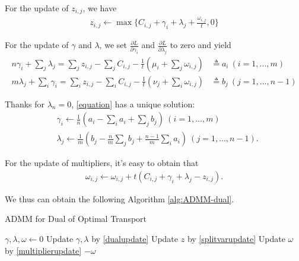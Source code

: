 \documentclass[english]{pkupaper}
\newenvironment{eqt}{\begin{equation}\begin{aligned}}{\end{aligned}\end{equation}}
\begin{document}
For the update of $z_{i, j}$, we have
\begin{eqt}
z_{i, j}\gets \max\{C_{i, j}+\gamma_i+\lambda_j+\frac{\omega_{i, j}}{t}, 0\} \label{splitvarupdate}
\end{eqt}

For the update of $\gamma$ and $\lambda$, we set $\frac{\partial L}{\partial \gamma_i}$ and $\frac{\partial L}{\partial \lambda_j}$ to zero and yield
\begin{eqt}
n\gamma_i+\sum_j\lambda_j = \sum_jz_{i, j}-\sum_jC_{i, j}-\frac{1}{t}(\mu_i+\sum_j\omega_{i, j})&\triangleq a_i\ (i=1, ..., m)\\
m\lambda_j + \sum_i\gamma_i = \sum_iz_{i, j} - \sum_iC_{i, j} - \frac{1}{t}(\nu_j+\sum_i\omega_{i, j})&\triangleq b_j\ (j=1, ..., n-1) \label{equation}
\end{eqt}

Thanks for $\lambda_n=0$, \ref{equation} has a unique solution:
\begin{eqt}
&\gamma_i \gets \frac{1}{n}\left(a_i-\sum_ia_i+\sum_jb_j\right)\ (i=1, ..., m)\\
&\lambda_j \gets \frac{1}{m}\left(b_j - \frac{n}{m}\sum_jb_j+\frac{n-1}{m}\sum_ia_i\right)\ (j=1, ..., n-1). \label{dualupdate}
\end{eqt}

For the update of multipliers, it's easy to obtain that
\begin{eqt}
\omega_{i, j}\gets \omega_{i, j}+t(C_{i, j}+\gamma_i+\lambda_j-z_{i, j}). \label{multiplierupdate}
\end{eqt}

We thus can obtain the following Algorithm \ref{alg:ADMM-dual}.

\begin{algorithm}
\caption{ADMM for Dual of Optimal Transport}
\label{alg:ADMM-dual}
\begin{algorithmic}[1]
\STATE $\gamma, \lambda, \omega\gets 0$
	\STATE Update $\gamma, \lambda$ by \ref{dualupdate}
	\STATE Update $z$ by \ref{splitvarupdate}
	\STATE Update $\omega$  by \ref{multiplierupdate}
\ENDWHILE
\RETURN $-\omega$
\end{algorithmic}
\end{algorithm}
\end{document}
